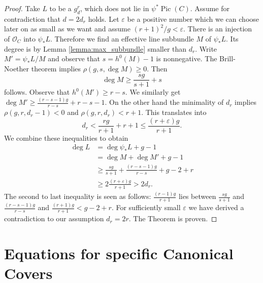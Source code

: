 \documentclass[12pt]{extarticle}
\theoremstyle{definition}
\numberwithin{theorem}{section}
\newcommand{\OO}{\mathcal{O}}
\newcommand{\op}{\operatorname}
\begin{document}
\begin{proof} Take $L$ to be a $g^r_d$, which does not lie in $\psi^*\op{Pic}(C)$. Assume for contradiction that $d = 2d_r$ holds. Let $\varepsilon$ be a positive number which we can choose later on as small as we want and assume $(r+1)^2/g < \varepsilon$. There is an injection of $\OO_C$ into $\psi_*L$. Therefore we find an effective line subbundle $M$ of $\psi_*L$. Its degree is by Lemma \ref{lemma:max_subbundle} smaller than $d_r$. Write $M' = \psi_*L /M$ and observe that $s = h^0(M) -1$ is nonnegative. The Brill-Noether theorem implies $\rho(g,s,\deg M) \geq 0$. Then
\begin{equation*}
\deg M \geq \frac{sg}{s+1} + s
\end{equation*}
follows. Observe that $h^0(M') \geq r-s$. We similarly get $\deg M' \geq \frac{(r-s-1)g}{r-s} + r- s-1$. On the other hand the minimality of $d_r$ implies $\rho(g,r,d_r-1) < 0$ and $\rho(g,r,d_r) < r+1$. This translates into
\begin{equation*}
d_r < \frac{rg}{r+1} +r+1 \leq \frac{(r + \varepsilon)g}{r+1}. 
\end{equation*}
We combine these inequalities to obtain 
\begin{align*}
\deg L &= \deg \psi_*L + g-1 \\&= \deg M + \deg M' + g -1  \\&\geq \frac{sg}{s+1} + \frac{(r-s-1)g}{r-s} + g-2 + r\\ & \geq 2\frac{(r + \varepsilon)g}{r+1} > 2d_r. 
\end{align*}
The second to last inequality is seen as follows: $\frac{(r-1)g}{r+1}$ lies between $\frac{sg}{s+1}$ and $\frac{(r-s-1)g}{r-s}$ and $\frac{(r+1)g}{r+1} < g - 2 +r$. For sufficiently small $\varepsilon$ we have derived a contradiction to our assumption $d_r = 2r$. The Theorem is proven.
\end{proof}
\section{Equations for specific Canonical Covers}\label{section:equations}
\end{document}
